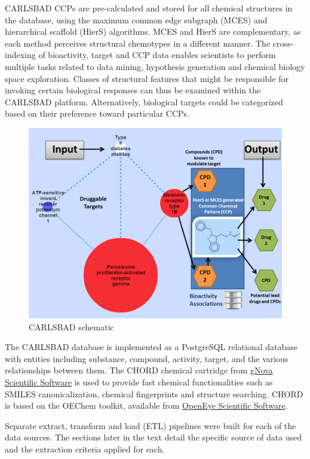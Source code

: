 CARLSBAD CCPs are pre-calculated and stored for all chemical structures in the database, using the maximum common edge subgraph (MCES) and hierarchical scaffold (HierS) algorithms. MCES and HierS are complementary, as each method perceives structural chemotypes in a different manner. The cross-indexing of bioactivity, target and CCP data enables scientists to perform multiple tasks related to data mining, hypothesis generation and chemical biology space exploration. Classes of structural features that might be responsible for invoking certain biological responses can thus be examined within the CARLSBAD platform. Alternatively, biological targets could be categorized based on their preference toward particular CCPs.

\begin{figure}
    \centering
    \includegraphics[width=\textwidth]{figures/carlsbad/CB1_Screenshots.png}
    \caption{CARLSBAD schematic}
    \label{fig:cb_schematic}
\end{figure}

The CARLSBAD database is implemented as a PostgreSQL relational database with entities including substance, compound, activity, target, and the various relationships between them. The CHORD chemical cartridge from \href{https://www.gnova.com/}{gNova Scientific Software} is used to provide fast chemical functionalities such as SMILES canonicalization\cite{Weininger1989-kh}, chemical fingerprints and structure searching. CHORD is based on the OEChem toolkit, available from \href{https://www.eyesopen.com/}{OpenEye Scientific Software}.

Separate extract, transform and load (ETL) pipelines were built for each of the data sources. The sections later in the text detail the specific source of data used and the extraction criteria applied for each.

